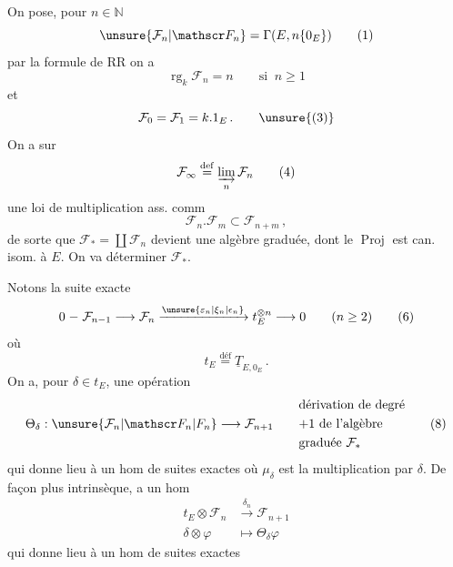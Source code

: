On pose, pour $n\in\mathbb N$
\[
\unsure{\mathcal F_n|\mathscr F_n}=\Gamma(E,n\{0_E\}) \tag*{(1)}
\]
par la formule de RR on a
\[
\operatorname{rg}_k\mathcal F_n=n\qquad\text{si }\ n\geq1 \tag*{(2)}
\]
et
\[
\mathcal F_0=\mathcal F_1=k.1_E\,. \tag*{\unsure{(3)}}
\]
On a  sur
\[
\mathcal F_\infty\overset{\mathrm{def}}{=}\varinjlim_n\mathcal F_n \tag*{(4)}
\]
une loi de multiplication ass. comm
\[
\mathcal F_n.\mathcal F_m\subset\mathcal F_{n+m}\,, \tag*{(5)}
\]
de sorte que $\mathcal F_*=\coprod\mathcal F_n$ devient une algèbre graduée, dont le $\operatorname{Proj}$ est can. isom. à $E$. On va déterminer $\mathcal F_*$.

Notons la suite exacte
\[
0\mathrel{-}\mathcal F_{n-1}\longrightarrow\mathcal F_n
\xrightarrow{\unsure{\varepsilon_n|\xi_n|\epsilon_n}}t_E^{\otimes n}\longrightarrow0\qquad(n\geq2) \tag*{(6)}
\]
où
\[
t_E\overset{\text{déf}}{=}\underline T_{E,0_E}\,. \tag*{(7)}
\]
On a, pour $\delta\in t_E$, une opération
\[
\Theta_\delta:\unsure{\mathcal F_n|\mathscr F_n|F_n}\longrightarrow\mathcal F_{n+1}
\qquad\begin{aligned}&\text{dérivation de degré}\\&\text{$+1$ de l'algèbre}\\&\text{graduée $\mathcal F_*$}\end{aligned}
\tag*{(8)}
\]
qui donne lieu à un hom de suites exactes
où $\mu_\delta$ est la multiplication par $\delta$. De façon plus intrinsèque,  a un hom
\[
\begin{aligned}
t_E\otimes\mathcal F_n&\xrightarrow{\delta_n}\mathcal F_{n+1}\\
\delta\otimes\varphi&\longmapsto\Theta_\delta\varphi
\end{aligned}\tag*{(10)}
\]
qui donne lieu à un hom de suites exactes
